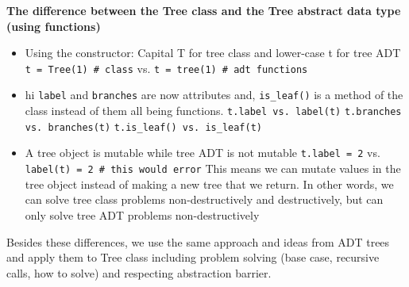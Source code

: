 \vspace{2mm}
\textbf{The difference between the Tree class and the Tree abstract data type (using functions)}
\begin{itemize}
\item Using the constructor: Capital T for tree class and lower-case t for tree ADT
    \subitem \lstinline{t = Tree(1) # class} vs. \lstinline{t = tree(1) # adt functions}
\item hi \lstinline{label} and \lstinline{branches} are now attributes and, \lstinline{is_leaf()} is a method of the class instead of them all being functions.
    \subitem \lstinline{t.label vs. label(t)}
    \subitem \lstinline{t.branches vs. branches(t)}
    \subitem \lstinline{t.is_leaf() vs. is_leaf(t)}
\item A tree object is mutable while tree ADT is not mutable
    \subitem \lstinline{t.label = 2} vs. \lstinline{label(t) = 2 # this would error}
    \subitem This means we can mutate values in the tree object instead of making a new tree that we return. In other words, we can solve tree class problems non-destructively and destructively, but can only solve tree ADT problems non-destructively
\end{itemize}
Besides these differences, we use the same approach and ideas from ADT trees and apply them to Tree class including problem solving (base case, recursive calls, how to solve)  and respecting abstraction barrier. 
